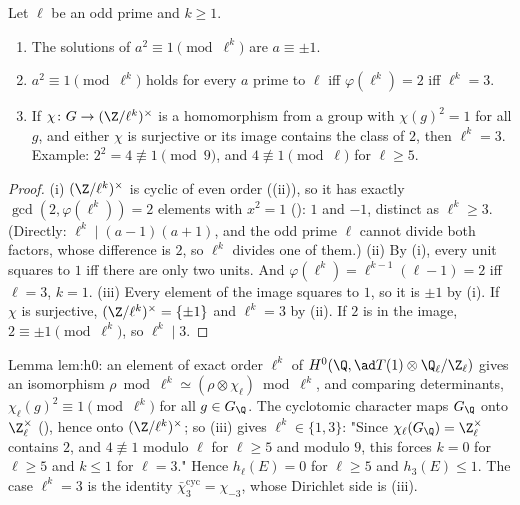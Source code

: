 \begin{corollary}\label{cor:rings:squares-one}
Let $\ell$ be an odd prime and $k\ge1$.
\begin{enumerate}[label=(\roman*)]
\item The solutions of $a^2\equiv1\pmod{\ell^k}$ are $a\equiv\pm1$.
\item $a^2\equiv1\pmod{\ell^k}$ holds for every $a$ prime to $\ell$ iff $\varphi(\ell^k)=2$ iff $\ell^k=3$.
\item If $\chi\colon G\to(\Z/\ell^k)^\times$ is a homomorphism from a group with $\chi(g)^2=1$ for all $g$, and either $\chi$ is surjective or its image
contains the class of $2$, then $\ell^k=3$. Example: $2^2=4\not\equiv1\pmod9$, and $4\not\equiv1\pmod\ell$ for $\ell\ge5$.
\end{enumerate}
\end{corollary}

\begin{proof}
(i) $(\Z/\ell^k)^\times$ is cyclic of even order ((ii)), so it has exactly $\gcd(2,\varphi(\ell^k))=2$ elements with $x^2=1$
(): $1$ and $-1$, distinct as $\ell^k\ge3$. (Directly: $\ell^k\mid(a-1)(a+1)$, and the odd prime $\ell$ cannot divide both factors,
whose difference is $2$, so $\ell^k$ divides one of them.) (ii) By (i), every unit squares to $1$ iff there are only two units. And
$\varphi(\ell^k)=\ell^{k-1}(\ell-1)=2$ iff $\ell=3$, $k=1$. (iii) Every element of the image squares to $1$, so it is $\pm1$ by (i). If $\chi$ is
surjective, $(\Z/\ell^k)^\times=\{\pm1\}$ and $\ell^k=3$ by (ii). If $2$ is in the image, $2\equiv\pm1\pmod{\ell^k}$, so $\ell^k\mid3$.
\end{proof}

\begin{paperlink}\label{pl:rings:h0}
Lemma lem:h0: an element of
exact order $\ell^k$ of $H^0(\Q,\ad T(1)\otimes\Q_\ell/\Z_\ell)$ gives an isomorphism $\rho\bmod\ell^k\simeq(\rho\otimes\chi_\ell)\bmod\ell^k$, and comparing
determinants, $\chi_\ell(g)^2\equiv1\pmod{\ell^k}$ for all $g\in G_\Q$. The cyclotomic character maps $G_\Q$ onto $\Z_\ell^\times$ (), hence onto
$(\Z/\ell^k)^\times$; so (iii) gives $\ell^k\in\{1,3\}$: "Since $\chi_\ell(G_\Q)=\Z_\ell^\times$ contains $2$, and $4\not\equiv1$
modulo $\ell$ for $\ell\ge5$ and modulo $9$, this forces $k=0$ for $\ell\ge5$ and $k\le1$ for $\ell=3$." Hence $h_\ell(E)=0$ for $\ell\ge5$ and
$h_3(E)\le1$. The case $\ell^k=3$ is the identity $\bar\chi_3^{\mathrm{cyc}}=\chi_{-3}$, whose Dirichlet side is (iii).
\end{paperlink}

